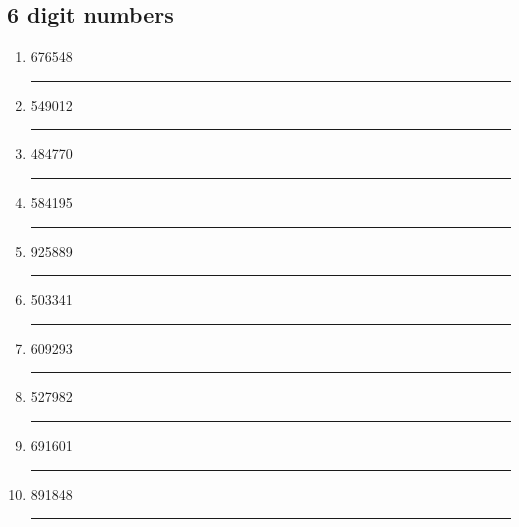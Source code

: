 \documentclass[11pt]{article}
\begin{document}
\subsection{6 digit numbers}
\begin{enumerate}[nosep]
    \item 676548 \\
    \rule{0cm}{20pt}\rule[0cm]{10cm}{0.4pt}
    \item 549012 \\
    \rule{0cm}{20pt}\rule[0cm]{10cm}{0.4pt}
    \item 484770 \\
    \rule{0cm}{20pt}\rule[0cm]{10cm}{0.4pt}
    \item 584195 \\
    \rule{0cm}{20pt}\rule[0cm]{10cm}{0.4pt}
    \item 925889 \\
    \rule{0cm}{20pt}\rule[0cm]{10cm}{0.4pt}
    \item 503341 \\
    \rule{0cm}{20pt}\rule[0cm]{10cm}{0.4pt}
    \item 609293 \\
    \rule{0cm}{20pt}\rule[0cm]{10cm}{0.4pt}
    \item 527982 \\
    \rule{0cm}{20pt}\rule[0cm]{10cm}{0.4pt}
    \item 691601 \\
    \rule{0cm}{20pt}\rule[0cm]{10cm}{0.4pt}
    \item 891848 \\
    \rule{0cm}{20pt}\rule[0cm]{10cm}{0.4pt}
\end{enumerate}

\newpage
\end{document}

